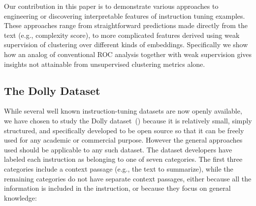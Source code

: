 Our contribution in this paper is to demonstrate various approaches to engineering or discovering interpretable features of instruction tuning examples. These approaches range from straightforward predictions made directly from the text (e.g., complexity score), to more complicated features derived using weak supervision of clustering over different kinds of embeddings. Specifically we show how an analog of conventional ROC analysis together with weak supervision gives insights not attainable from unsupervised clustering metrics alone.

\subsection{The Dolly Dataset}
While several well known instruction-tuning datasets are now openly available, we have chosen to study the Dolly dataset~(\cite{DatabricksBlog2023DollyV2}) because it is relatively small, simply structured, and specifically developed to be open source so that it can be freely used for any academic or commercial purpose. However the general approaches used should be applicable to any such dataset.
The dataset developers have labeled each instruction as belonging to one of seven categories. The first three categories include a context passage (e.g., the text to summarize), while the remaining categories do not have separate context passages, either because all the information is included in the instruction, or because they focus on general knowledge:

